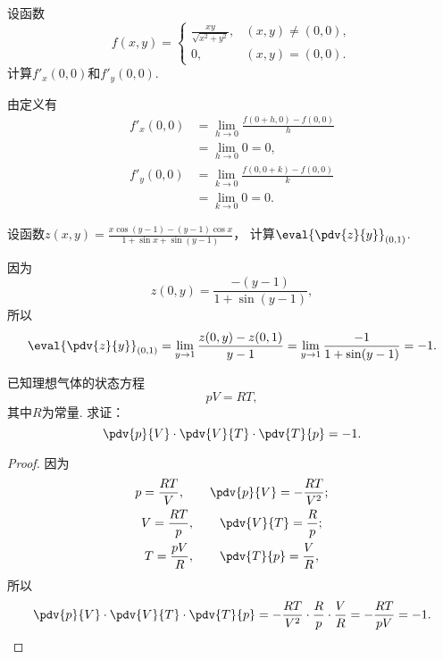\begin{example}
设函数\begin{equation*}
	f(x,y) = \left\{ \begin{array}{cl}
		\frac{xy}{\sqrt{x^2+y^2}}, & (x,y)\neq(0,0), \\
		0, & (x,y)=(0,0).
	\end{array} \right.
\end{equation*}
计算\(f'_x(0,0)\)和\(f'_y(0,0)\).
\begin{solution}
由定义有\begin{align*}
	f'_x(0,0)
	&= \lim_{h\to0} \frac{f(0+h,0) - f(0,0)}{h} \\
	&= \lim_{h\to0} 0
	= 0, \\
	f'_y(0,0)
	&= \lim_{k\to0} \frac{f(0,0+k) - f(0,0)}{k} \\
	&= \lim_{k\to0} 0
	= 0.
\end{align*}
\end{solution}
\end{example}
\begin{example}
设函数\(z(x,y) = \frac{x \cos(y-1) - (y-1) \cos x}{1 + \sin x + \sin(y-1)}\)，
计算\(\eval{\pdv{z}{y}}_{(0,1)}\).
\begin{solution}
因为\begin{equation*}
	z(0,y) = \frac{-(y-1)}{1 + \sin(y-1)},
\end{equation*}
所以\begin{equation*}
	\eval{\pdv{z}{y}}_{(0,1)}
	= \lim_{y\to1} \frac{z(0,y) - z(0,1)}{y - 1}
	= \lim_{y\to1} \frac{-1}{1 + \sin(y-1)}
	= -1.
\end{equation*}
\end{solution}
\end{example}

\begin{example}
已知理想气体的状态方程\begin{equation*}
	pV = RT,
\end{equation*}
其中\(R\)为常量.
求证：\begin{equation*}
	\pdv{p}{V} \cdot \pdv{V}{T} \cdot \pdv{T}{p} = -1.
\end{equation*}
\begin{proof}
因为\begin{gather*}
	p = \frac{RT}{V},
	\qquad
	\pdv{p}{V} = -\frac{RT}{V^2}; \\
	V = \frac{RT}{p},
	\qquad
	\pdv{V}{T} = \frac{R}{p}; \\
	T = \frac{pV}{R},
	\qquad
	\pdv{T}{p} = \frac{V}{R},
\end{gather*}
所以\begin{equation*}
	\pdv{p}{V} \cdot \pdv{V}{T} \cdot \pdv{T}{p}
	= -\frac{RT}{V^2} \cdot \frac{R}{p} \cdot \frac{V}{R}
	= -\frac{RT}{pV} = -1.
	\qedhere
\end{equation*}
\end{proof}
\end{example}

